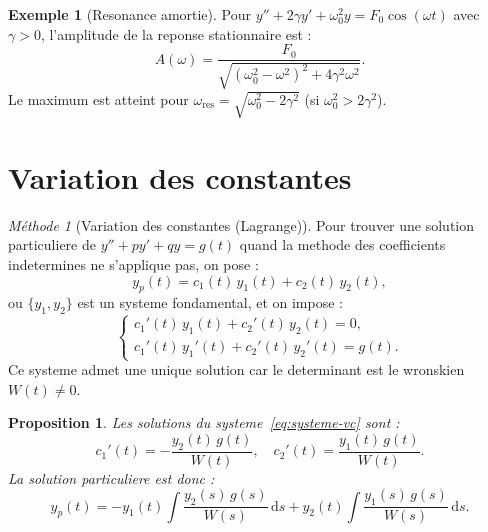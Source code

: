 \documentclass[12pt,a4paper,openany]{book}
\theoremstyle{definition}
\newtheorem{exemple}[definition]{Exemple}
\theoremstyle{plain}
\newtheorem{proposition}[definition]{Proposition}
\theoremstyle{remark}
\newtheorem{methode}[definition]{Méthode}
\newcommand{\dd}{\mathrm{d}}
\begin{document}
\begin{exemple}[Resonance amortie]\label{ex:resonance-amortie}
Pour $y'' + 2\gamma y' + \omega_0^2 y = F_0 \cos(\omega t)$ avec $\gamma > 0$, l'amplitude de la reponse stationnaire est :
\[
  A(\omega) = \frac{F_0}{\sqrt{(\omega_0^2 - \omega^2)^2 + 4\gamma^2 \omega^2}}.
\]
Le maximum est atteint pour $\omega_{\mathrm{res}} = \sqrt{\omega_0^2 - 2\gamma^2}$ (si $\omega_0^2 > 2\gamma^2$).
\end{exemple}

\section{Variation des constantes}\label{sec:variation-constantes}

\begin{methode}[Variation des constantes (Lagrange)]\label{meth:variation-constantes}
Pour trouver une solution particuliere de $y'' + py' + qy = g(t)$ quand la methode des coefficients indetermines ne s'applique pas, on pose :
\[
  y_p(t) = c_1(t)\, y_1(t) + c_2(t)\, y_2(t),
\]
ou $\{y_1, y_2\}$ est un systeme fondamental, et on impose :
\begin{equation}\label{eq:systeme-vc}
\begin{cases}
c_1'(t)\, y_1(t) + c_2'(t)\, y_2(t) = 0, \\
c_1'(t)\, y_1'(t) + c_2'(t)\, y_2'(t) = g(t).
\end{cases}
\end{equation}
Ce systeme admet une unique solution car le determinant est le wronskien $W(t) \neq 0$.
\end{methode}

\begin{proposition}\label{prop:formules-vc}
Les solutions du systeme~\eqref{eq:systeme-vc} sont :
\begin{equation}\label{eq:vc-formules}
  c_1'(t) = -\frac{y_2(t)\, g(t)}{W(t)}, \quad c_2'(t) = \frac{y_1(t)\, g(t)}{W(t)}.
\end{equation}
La solution particuliere est donc :
\[
  y_p(t) = -y_1(t)\int \frac{y_2(s)\, g(s)}{W(s)}\, \dd s + y_2(t)\int \frac{y_1(s)\, g(s)}{W(s)}\, \dd s.
\]
\end{proposition}
\end{document}
